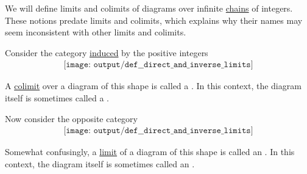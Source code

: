 \begin{definition}\label{def:direct_and_inverse_limits}
  We will define limits and colimits of diagrams over infinite \hyperref[def:partial_order_chain]{chains} of integers. These notions predate limits and colimits, which explains why their names may seem inconsistent with other limits and colimits.

  \begin{thmenum}
     Consider the category \hyperref[thm:order_category_isomorphism]{induced} by the positive integers
    \begin{equation}\label{eq:def:direct_and_inverse_limits/direct}
      \begin{aligned}
        \texttt{[image: output/def\_\_direct\_and\_inverse\_limits]}
      \end{aligned}
    \end{equation}

    A \hyperref[def:category_of_cones/colimit]{colimit} over a diagram of this shape is called a . In this context, the diagram itself is sometimes called a .

     Now consider the opposite category
    \begin{equation}\label{eq:def:direct_and_inverse_limits/inverse}
      \begin{aligned}
        \texttt{[image: output/def\_\_direct\_and\_inverse\_limits]}
      \end{aligned}
    \end{equation}

    Somewhat confusingly, a \hyperref[def:category_of_cones/limit]{limit} of a diagram of this shape is called an . In this context, the diagram itself is sometimes called an .
  \end{thmenum}
\end{definition}

